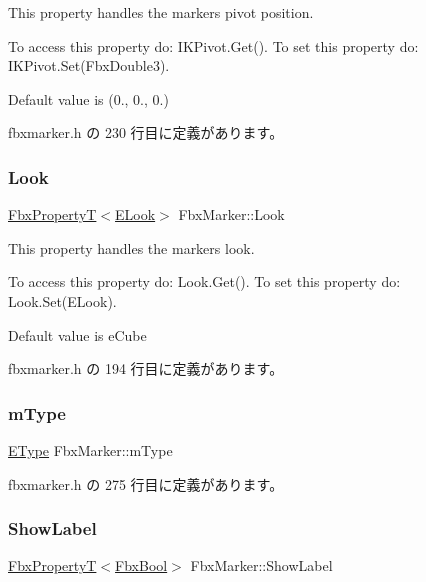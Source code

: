 This property handles the marker\textquotesingle{}s pivot position.

To access this property do\+: I\+K\+Pivot.\+Get(). To set this property do\+: I\+K\+Pivot.\+Set(\+Fbx\+Double3).

Default value is (0., 0., 0.) 

 fbxmarker.\+h の 230 行目に定義があります。

\mbox{\label{class_fbx_marker_a2d9dd3145381febcecd131cfce58cf65}} 
\subsubsection{\texorpdfstring{Look}{Look}}
{\footnotesize\ttfamily \hyperlink{class_fbx_property_t}{Fbx\+PropertyT}$<$\hyperlink{class_fbx_marker_a9e1fa9873c0d6da391d82d0de6a352c4}{E\+Look}$>$ Fbx\+Marker\+::\+Look}

This property handles the marker\textquotesingle{}s look.

To access this property do\+: Look.\+Get(). To set this property do\+: Look.\+Set(\+E\+Look).

Default value is e\+Cube 

 fbxmarker.\+h の 194 行目に定義があります。

\mbox{\label{class_fbx_marker_ad3808ca152160cea3a100715d2511ec0}} 
\subsubsection{\texorpdfstring{m\+Type}{mType}}
{\footnotesize\ttfamily \hyperlink{class_fbx_marker_ad1e38753dce9a2212df0364466d9f617}{E\+Type} Fbx\+Marker\+::m\+Type\hspace{0.3cm}{\ttfamily [protected]}}



 fbxmarker.\+h の 275 行目に定義があります。

\mbox{\label{class_fbx_marker_a69f9f3df5f70b603a2edf4393873ed14}} 
\subsubsection{\texorpdfstring{Show\+Label}{ShowLabel}}
{\footnotesize\ttfamily \hyperlink{class_fbx_property_t}{Fbx\+PropertyT}$<$\hyperlink{fbxtypes_8h_a92e0562b2fe33e76a242f498b362262e}{Fbx\+Bool}$>$ Fbx\+Marker\+::\+Show\+Label}

